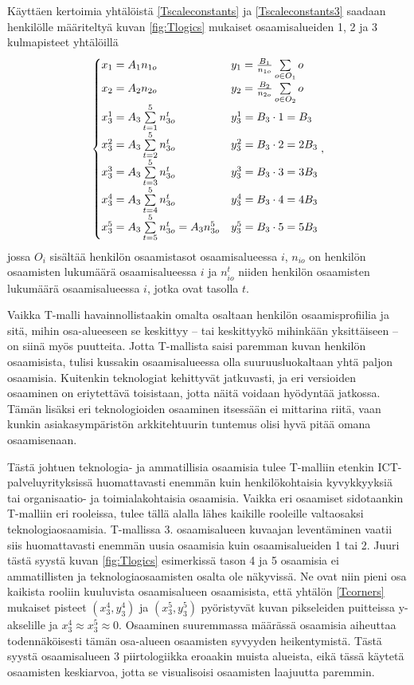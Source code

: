 \documentclass[a4paper,finnish,12pt]{article}
\begin{document}
Käyttäen kertoimia yhtälöistä \eqref{Tscaleconstants} ja \eqref{Tscaleconstants3} saadaan henkilölle määriteltyä kuvan \ref{fig:Tlogics} mukaiset osaamisalueiden 1, 2 ja 3 kulmapisteet yhtälöillä
\begin{equation}
\begin{cases}
x_1 = A_1 n_{1o} & y_1 = \frac{B_1}{n_{1o}} \sum\limits_{o \in O_1} o \\
x_2 = A_2 n_{2o} & y_2 = \frac{B_2}{n_{2o}} \sum\limits_{o \in O_2} o \\
x_3^1 = A_3 \sum\limits_{t = 1}^{5} n_{3o}^t & y_3^1 = B_3 \cdot 1 = B_3 \\
x_3^2 = A_3 \sum\limits_{t = 2}^{5} n_{3o}^t & y_3^2 = B_3 \cdot 2 = 2 B_3 \\
x_3^3 = A_3 \sum\limits_{t = 3}^{5} n_{3o}^t & y_3^3 = B_3 \cdot 3 = 3 B_3 \\
x_3^4 = A_3 \sum\limits_{t = 4}^{5} n_{3o}^t & y_3^4= B_3 \cdot 4 = 4 B_3 \\
x_3^5 = A_3 \sum\limits_{t = 5}^{5} n_{3o}^t = A_3 n_{3o}^5 & y_3^5 = B_3 \cdot 5 = 5 B_3
\end{cases} \\ ,
\label{Tcorners}
\end{equation} jossa $O_i$ sisältää henkilön osaamistasot osaamisalueessa $i$, $n_{io}$ on henkilön osaamisten lukumäärä osaamisalueessa $i$ ja $n_{io}^t$ niiden henkilön osaamisten lukumäärä osaamisalueessa $i$, jotka ovat tasolla $t$.

Vaikka T-malli havainnollistaakin omalta osaltaan henkilön osaamisprofiilia ja sitä, mihin osa-alueeseen se keskittyy -- tai keskittyykö mihinkään yksittäiseen -- on siinä myös puutteita. Jotta T-mallista saisi paremman kuvan henkilön osaamisista, tulisi kussakin osaamisalueessa olla suuruusluokaltaan yhtä paljon osaamisia. Kuitenkin teknologiat kehittyvät jatkuvasti, ja eri versioiden osaaminen on eriytettävä toisistaan, jotta näitä voidaan hyödyntää jatkossa. Tämän lisäksi eri teknologioiden osaaminen itsessään ei mittarina riitä, vaan kunkin asiakasympäristön arkkitehtuurin tuntemus olisi hyvä pitää omana osaamisenaan.

Tästä johtuen teknologia- ja ammatillisia osaamisia tulee T-malliin etenkin ICT-palveluyrityksissä huomattavasti enemmän kuin henkilökohtaisia kyvykkyyksiä tai organisaatio- ja toimialakohtaisia osaamisia. Vaikka eri osaamiset sidotaankin T-malliin eri rooleissa, tulee tällä alalla lähes kaikille rooleille valtaosaksi teknologiaosaamisia. T-mallissa 3. osaamisalueen kuvaajan leventäminen vaatii siis huomattavasti enemmän uusia osaamisia kuin osaamisalueiden 1 tai 2. Juuri tästä syystä kuvan \ref{fig:Tlogics} esimerkissä tason 4 ja 5 osaamisia ei ammatillisten ja teknologiaosaamisten osalta ole näkyvissä. Ne ovat niin pieni osa kaikista rooliin kuuluvista osaamisalueen osaamisista, että yhtälön \eqref{Tcorners} mukaiset pisteet $(x_3^4, y_3^4)$ ja $(x_3^5, y_3^5)$ pyöristyvät kuvan pikseleiden puitteissa y-akselille ja $x_3^4 \approx x_3^5 \approx 0$. Osaaminen suuremmassa määrässä osaamisia aiheuttaa todennäköisesti tämän osa-alueen osaamisten syvyyden heikentymistä. Tästä syystä osaamisalueen 3 piirtologiikka eroaakin muista alueista, eikä tässä käytetä osaamisten keskiarvoa, jotta se visualisoisi osaamisten laajuutta paremmin.
\end{document}
